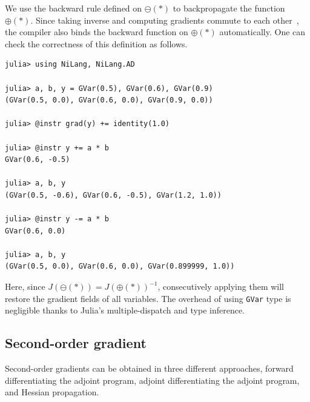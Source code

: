 \documentclass[aps,twocolumn,longbibliography,english,superscriptaddress]{revtex4-1}
\newcommand{\<}{\langle}
\renewcommand{\>}{\rangle}
\theoremstyle{definition}\newtheorem{definition}{\textit{Definition}}
\begin{document}
We use the backward rule defined on $\ominus(*)$ to backpropagate the function $\oplus(*)$.
Since taking inverse and computing gradients commute to each other~\cite{Mcinerney2015}, the compiler also binds the backward function on $\oplus(*)$ automatically.
One can check the correctness of this definition as follows.

\begin{minipage}{.44\textwidth}
\begin{lstlisting}[mathescape=true]
julia> using NiLang, NiLang.AD

julia> a, b, y = GVar(0.5), GVar(0.6), GVar(0.9)
(GVar(0.5, 0.0), GVar(0.6, 0.0), GVar(0.9, 0.0))

julia> @instr grad(y) += identity(1.0)

julia> @instr y += a * b
GVar(0.6, -0.5)

julia> a, b, y
(GVar(0.5, -0.6), GVar(0.6, -0.5), GVar(1.2, 1.0))

julia> @instr y -= a * b
GVar(0.6, 0.0)

julia> a, b, y
(GVar(0.5, 0.0), GVar(0.6, 0.0), GVar(0.899999, 1.0))
\end{lstlisting}
\end{minipage}

Here, since $J(\ominus(*)) = J(\oplus(*))^{-1}$, consecutively applying them will restore the gradient fields of all variables.
The overhead of using \texttt{GVar} type is negligible thanks to Julia's multiple-dispatch and type inference.


\subsection{Second-order gradient}
Second-order gradients can be obtained in three different approaches, forward differentiating the adjoint program, adjoint differentiating the adjoint program, and Hessian propagation.
\end{document}
